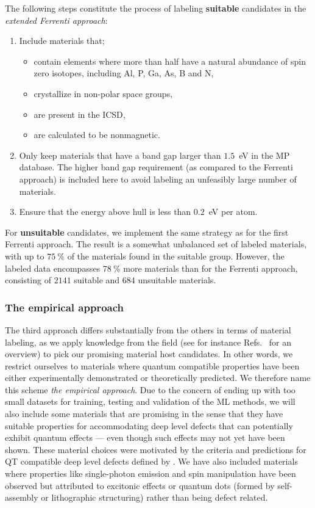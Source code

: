 \documentclass[superscriptaddress,unsortedaddress,
 amsmath,amssymb,
 aps,
]{revtex4-2}
\begin{document}
The following steps constitute the process of labeling \textbf{suitable} candidates in the \emph{extended Ferrenti approach}:
\begin{enumerate}
    \item Include materials that; 
    \begin{itemize}
        \item contain elements where more than half have a natural abundance of spin zero isotopes, including Al, P, Ga, As, B and N, 
        \item crystallize in non-polar space groups,
        \item are present in the ICSD,
        \item are calculated to be nonmagnetic. 
    \end{itemize}
    \item Only keep materials that have a band gap larger than $1.5$~eV in the MP database. The higher band gap requirement (as compared to the Ferrenti approach) is included here to avoid labeling an unfeasibly large number of materials. 
    \item Ensure that the energy above hull is less than $0.2$~eV per atom. 
\end{enumerate}

For \textbf{unsuitable} candidates, we implement the same strategy as for the first Ferrenti approach. The result is a somewhat unbalanced set of labeled materials, with up to $75 \ \%$ of the materials found in the suitable group. However, the labeled data encompasses $78 \ \%$ more materials than for the Ferrenti approach, consisting of $2141$ suitable and $684$ unsuitable materials.

\subsubsection*{The empirical approach}
The third approach differs substantially from the others in terms of material labeling, as we apply knowledge from the field (see for instance Refs.~\cite{Atatuere2018,Toth2019,Zhang2020,Son2020} for an overview) to pick our promising material host candidates.  
In other words, we restrict ourselves to materials where quantum compatible properties have been either experimentally demonstrated or theoretically predicted. 
We therefore name this scheme \emph{the empirical approach}. Due to the concern of ending up with too small datasets for training, testing and validation of the ML methods, we will also include some  materials that are promising in the sense that they have suitable properties for accommodating deep level defects that can potentially exhibit quantum effects --- even though such effects may not yet have been shown. These material choices were motivated by the criteria and predictions for QT compatible deep level defects defined by \citeauthor{Weber2010} \cite{Weber2010}. 
We have also included materials where properties like single-photon emission and spin manipulation have been observed but attributed to excitonic effects or quantum dots (formed by self-assembly or lithographic structuring) rather than being defect related.
\end{document}
